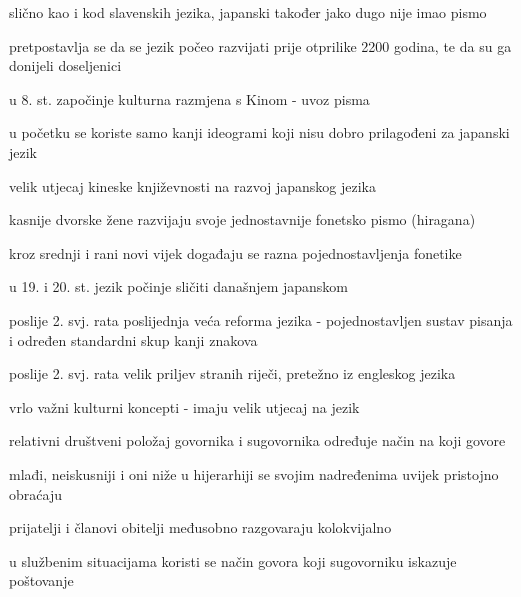 	\begin{hyou}
		\item slično kao i kod slavenskih jezika, japanski također jako dugo nije imao pismo
		\item pretpostavlja se da se jezik počeo razvijati prije otprilike 2200 godina, te da su ga donijeli doseljenici
		\item u 8. st. započinje kulturna razmjena s Kinom - uvoz pisma
		\item u početku se koriste samo kanji ideogrami koji nisu dobro prilagođeni za japanski jezik
		\item velik utjecaj kineske književnosti na razvoj japanskog jezika
		\item kasnije dvorske žene razvijaju svoje jednostavnije fonetsko pismo (hiragana)
		\item kroz srednji i rani novi vijek događaju se razna pojednostavljenja fonetike
		\item u 19. i 20. st. jezik počinje sličiti današnjem japanskom
		\item poslije 2. svj. rata poslijednja veća reforma jezika - pojednostavljen sustav pisanja i određen standardni skup kanji znakova
		\item poslije 2. svj. rata velik priljev stranih riječi, pretežno iz engleskog jezika
	\end{hyou}

	\begin{hyou}
		\item vrlo važni kulturni koncepti - imaju velik utjecaj na jezik
		\item relativni društveni položaj govornika i sugovornika određuje način na koji govore
		\item mlađi, neiskusniji i oni niže u hijerarhiji se svojim nadređenima uvijek pristojno obraćaju
		\item prijatelji i članovi obitelji međusobno razgovaraju kolokvijalno
		\item u službenim situacijama koristi se način govora koji sugovorniku iskazuje poštovanje
	\end{hyou}

